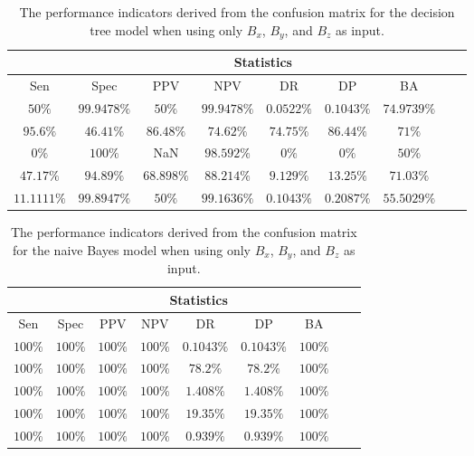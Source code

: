 \begin{table}[!ht]
	\centering
	\begin{tabular}{|c|c|c|c|c|c|c|c|c|}
		\hline
		 & \multicolumn{7}{c|}{Statistics} \\ \hline
		Sen & Spec & PPV & NPV & DR & DP & BA \\ \hline
		$50\%$ & $99.9478\%$ & $50\%$ & $99.9478\%$ & $0.0522\%$ & $0.1043\%$ & $74.9739\%$ \\ \hline
		$95.6\%$ & $46.41\%$ & $86.48\%$ & $74.62\%$ & $74.75\%$ & $86.44\%$ & $71\%$ \\ \hline
		$0\%$ & $100\%$ & NaN & $98.592\%$ & $0\%$ & $0\%$ & $50\%$ \\ \hline
		$47.17\%$ & $94.89\%$ & $68.898\%$ & $88.214\%$ & $9.129\%$ & $13.25\%$ & $71.03\%$ \\ \hline
		$11.1111\%$ & $99.8947\%$ & $50\%$ & $99.1636\%$ & $0.1043\%$ & $0.2087\%$ & $55.5029\%$ \\ \hline
	\end{tabular}
	\caption{The performance indicators derived from the confusion matrix for the decision tree model when using only $B_{x}$, $B_{y}$, and $B_{z}$ as input.}
	\label{tab:cs:coord:C5.0}
\end{table}

\begin{table}[!ht]
	\centering
	\begin{tabular}{|c|c|c|c|c|c|c|c|c|}
		\hline
		 & \multicolumn{7}{c|}{Statistics} \\ \hline
		Sen & Spec & PPV & NPV & DR & DP & BA \\ \hline
		$100\%$ & $100\%$ & $100\%$ & $100\%$ & $0.1043\%$ & $0.1043\%$ & $100\%$ \\ \hline
		$100\%$ & $100\%$ & $100\%$ & $100\%$ & $78.2\%$ & $78.2\%$ & $100\%$ \\ \hline
		$100\%$ & $100\%$ & $100\%$ & $100\%$ & $1.408\%$ & $1.408\%$ & $100\%$ \\ \hline
		$100\%$ & $100\%$ & $100\%$ & $100\%$ & $19.35\%$ & $19.35\%$ & $100\%$ \\ \hline
		$100\%$ & $100\%$ & $100\%$ & $100\%$ & $0.939\%$ & $0.939\%$ & $100\%$ \\ \hline
	\end{tabular}
	\caption{The performance indicators derived from the confusion matrix for the naive Bayes model when using only $B_{x}$, $B_{y}$, and $B_{z}$ as input.}
	\label{tab:cs:coord:nb}
\end{table}

